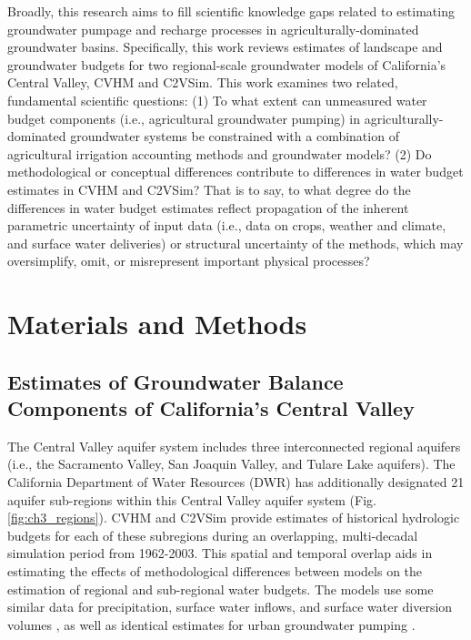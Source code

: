 Broadly, this research aims to fill scientific knowledge gaps related to estimating groundwater pumpage and recharge processes in agriculturally-dominated groundwater basins. Specifically, this work reviews estimates of landscape and groundwater budgets for two regional-scale groundwater models of California's Central Valley, CVHM and C2VSim. This work examines two related, fundamental scientific questions: (1) To what extent can unmeasured water budget components (i.e., agricultural groundwater pumping) in agriculturally-dominated groundwater systems be constrained with a combination of agricultural irrigation accounting methods and groundwater models? (2) Do methodological or conceptual differences contribute to differences in water budget estimates in CVHM and C2VSim? That is to say, to what degree do the differences in water budget estimates reflect propagation of the inherent parametric uncertainty of input data (i.e., data on crops, weather and climate, and surface water deliveries) or structural uncertainty of the methods, which may oversimplify, omit, or misrepresent important physical processes? 

\section{Materials and Methods}
\subsection{Estimates of Groundwater Balance Components of California’s Central Valley}

The Central Valley aquifer system includes three interconnected regional aquifers (i.e., the Sacramento Valley, San Joaquin Valley, and Tulare Lake aquifers). The California Department of Water Resources (DWR) has additionally designated 21 aquifer sub-regions within this Central Valley aquifer system (Fig. \ref{fig:ch3_regions}). CVHM and C2VSim provide estimates of historical hydrologic budgets for each of these subregions during an overlapping, multi-decadal simulation period from 1962-2003. This spatial and temporal overlap aids in estimating the effects of methodological differences between models on the estimation of regional and sub-regional water budgets. The models use some similar data for precipitation, surface water inflows, and surface water diversion volumes \citep{dogrul2011integrated}, as well as identical estimates for urban groundwater pumping \citep{brush2013development, faunt2009groundwater}.

